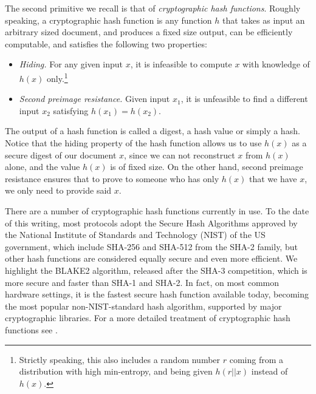 The second primitive we recall is that of {\em cryptographic hash functions}. Roughly speaking, a cryptographic hash function is any function $h$ that takes as input an arbitrary sized document, and produces a fixed size output, can be efficiently computable, and satisfies the following two properties:
\begin{itemize}
\item {\em Hiding.} For any given input $x$, it is infeasible to compute $x$ with knowledge of $h(x)$ only.\footnote{Strictly speaking, this also includes a random number $r$ coming from a distribution with high min-entropy, and being given $h(r||x)$ instead of $h(x)$.}
\item {\em Second preimage resistance.} Given input $x_1$, it is unfeasible to find a different input $x_2$ satisfying $h(x_1)=h(x_2)$.
\end{itemize}
The output of a hash function is called a digest, a hash value or simply a hash. Notice that the hiding property of the hash function allows us to use $h(x)$ as a secure digest of our document $x$, since we can not reconstruct $x$ from $h(x)$ alone, and the value $h(x)$ is of fixed size.
On the other hand, second preimage resistance ensures that to prove to someone who has only $h(x)$ that we have $x$, we only need to provide said $x$. 

There are a number of cryptographic hash functions currently in use. To the date of this writing, most protocols adopt the Secure Hash Algorithms\cite{sha_standard} approved by the National Institute of Standards and Technology (NIST) of the US government, which include SHA-256 and SHA-512 from the SHA-2 family, but other hash functions are considered equally secure and even more efficient. We highlight the BLAKE2 algorithm, released after the SHA-3 competition, which is more secure and faster than SHA-1 and SHA-2. In fact, on most common hardware settings, it is the fastest secure hash function available today, becoming the most popular non-NIST-standard hash algorithm, supported by major cryptographic libraries. For a more detailed treatment of cryptographic hash functions see \cite{sha_standard,aumasson,sha3zoo,bitcoinbook}. %

